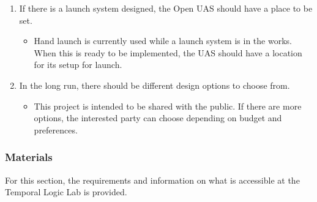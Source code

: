 \documentclass{article}
\begin{document}
\begin{enumerate}
  \item{If there is a launch system designed, the Open UAS should have a place to be set.}
  \begin{itemize}
    \item{Hand launch is currently used while a launch system is in the works. When this is ready to be implemented, the UAS should have a location for its setup for launch.}
  \end{itemize}
  
  \item{In the long run, there should be different design options to choose from.}
  \begin{itemize}
    \item{This project is intended to be shared with the public. If there are more options, the interested party can choose depending on budget and preferences.}
  \end{itemize}

\end{enumerate}

\subsubsection{Materials}
For this section, the requirements and information on what is accessible at the Temporal Logic Lab is provided.
\end{document}
